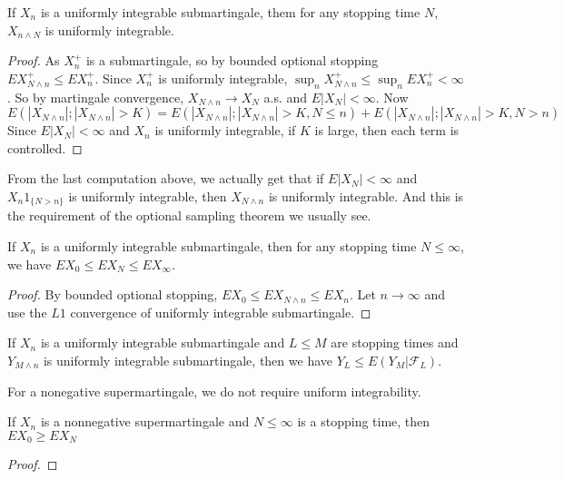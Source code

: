 \begin{theorem}
    If $X_n$ is a uniformly integrable submartingale, them for any stopping time $N$,
    $X_{n\wedge N}$ is uniformly integrable.
\end{theorem}
\begin{proof}
    As $X_n^+$ is a submartingale, so by bounded optional stopping $EX_{N\wedge n}^+ \le EX_n^+$.
    Since $X_n^+$ is uniformly integrable, $\sup_n X_{N\wedge n}^+ \le \sup_n EX_n^+ <\infty$. So by martingale convergence, $X_{N\wedge n}\to X_N$ a.s. and $E|X_N|<\infty$.
    Now
    \begin{equation*}
        E(|X_{N\wedge n}|;|X_{N\wedge n}|>K) = E(|X_{N\wedge n}|;|X_{N\wedge n}|>K,N\le n)+E(|X_{N\wedge n}|;|X_{N\wedge n}|>K,N>n)
    \end{equation*}
    Since $E|X_N|<\infty$ and $X_n$ is uniformly integrable, if $K$ is large, then each term is controlled.

\end{proof}
\begin{remark}
    From the last computation above, we actually get that if $E|X_N|<\infty$ and $X_n1_{\{N>n\}}$ is uniformly integrable,
    then $X_{N\wedge n}$ is uniformly integrable. And this is the requirement of the optional sampling theorem we usually see.
\end{remark}

\begin{theorem}
    If $X_n$ is a uniformly integrable submartingale, then for any stopping time $N\le \infty$,
    we have $EX_0\le EX_N\le EX_\infty$. 
\end{theorem}
\begin{proof}
    By bounded optional stopping, $EX_0\le EX_{N\wedge n}\le EX_n$. Let $n\to\infty$ and use the $L1$ convergence of uniformly integrable submartingale.
\end{proof}

\begin{theorem}
    If $X_n$ is a uniformly integrable submartingale and $L\le M$ are stopping times and $Y_{M\wedge n}$ is uniformly integrable submartingale,
    then we have $Y_L\le E(Y_M|\mathcal{F}_L)$. 
\end{theorem}

For a nonegative supermartingale, we do not require uniform integrability.
\begin{theorem}
    If $X_n$ is a nonnegative supermartingale and $N\le\infty$ is a stopping time,
    then $EX_0\ge EX_N$
\end{theorem}
\begin{proof}
    
\end{proof}

